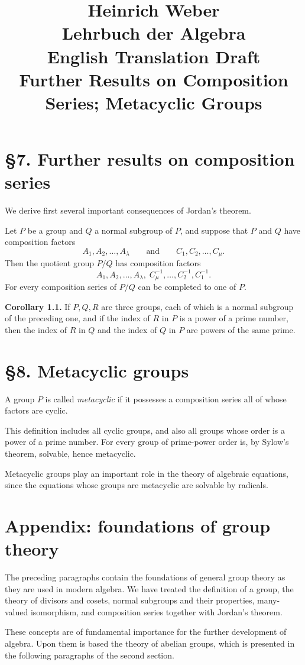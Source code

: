 \documentclass[11pt]{article}
\title{Heinrich Weber\\Lehrbuch der Algebra\\English Translation Draft\\Further Results on Composition Series; Metacyclic Groups}
\author{}
\date{}
\begin{document}
\maketitle

\section*{\S 7. Further results on composition series}

We derive first several important consequences of Jordan's theorem.

Let $P$ be a group and $Q$ a normal subgroup of $P$, and suppose that $P$ and $Q$ have composition factors
\[
A_1,A_2,\dots,A_\lambda
\qquad\text{and}\qquad
C_1,C_2,\dots,C_\mu.
\]
Then the quotient group $P/Q$ has composition factors
\[
A_1,A_2,\dots,A_\lambda,\; C_\mu^{-1},\dots,C_2^{-1},C_1^{-1}.
\]
For every composition series of $P/Q$ can be completed to one of $P$.

\medskip
\noindent\textbf{Corollary 1.1.}
If $P,Q,R$ are three groups, each of which is a normal subgroup of the preceding one, and if the index of $R$ in $P$ is a power of a prime number, then the index of $R$ in $Q$ and the index of $Q$ in $P$ are powers of the same prime.

\section*{\S 8. Metacyclic groups}

A group $P$ is called \emph{metacyclic} if it possesses a composition series all of whose factors are cyclic.

This definition includes all cyclic groups, and also all groups whose order is a power of a prime number. For every group of prime-power order is, by Sylow's theorem, solvable, hence metacyclic.

Metacyclic groups play an important role in the theory of algebraic equations, since the equations whose groups are metacyclic are solvable by radicals.

\section*{Appendix: foundations of group theory}

The preceding paragraphs contain the foundations of general group theory as they are used in modern algebra. We have treated the definition of a group, the theory of divisors and cosets, normal subgroups and their properties, many-valued isomorphism, and composition series together with Jordan's theorem.

These concepts are of fundamental importance for the further development of algebra. Upon them is based the theory of abelian groups, which is presented in the following paragraphs of the second section.
\end{document}
